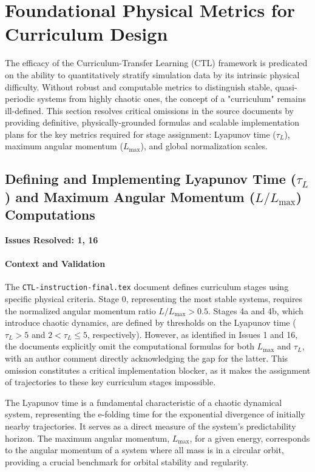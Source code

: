 \documentclass[11pt, a4paper]{article}
\begin{document}
\clearpage
\section{Foundational Physical Metrics for Curriculum Design}
The efficacy of the Curriculum-Transfer Learning (CTL) framework is predicated on the ability to quantitatively stratify simulation data by its intrinsic physical difficulty. Without robust and computable metrics to distinguish stable, quasi-periodic systems from highly chaotic ones, the concept of a "curriculum" remains ill-defined. This section resolves critical omissions in the source documents by providing definitive, physically-grounded formulas and scalable implementation plans for the key metrics required for stage assignment: Lyapunov time ($\tau_L$), maximum angular momentum ($L_{\max}$), and global normalization scales.

\subsection{Defining and Implementing Lyapunov Time (\texorpdfstring{$\tau_L$}{tau\_L}) and Maximum Angular Momentum (\texorpdfstring{$L/L_{\max}$}{L/L\_max}) Computations}
\textbf{Issues Resolved: 1, 16}
\paragraph{Context and Validation}
The \texttt{CTL-instruction-final.tex} document defines curriculum stages using specific physical criteria. Stage 0, representing the most stable systems, requires the normalized angular momentum ratio $L/L_{\max} > 0.5$. Stages 4a and 4b, which introduce chaotic dynamics, are defined by thresholds on the Lyapunov time ($\tau_L > 5$ and $2 < \tau_L \leq 5$, respectively). However, as identified in Issues 1 and 16, the documents explicitly omit the computational formulas for both $L_{\max}$ and $\tau_L$, with an author comment directly acknowledging the gap for the latter. This omission constitutes a critical implementation blocker, as it makes the assignment of trajectories to these key curriculum stages impossible.

The Lyapunov time is a fundamental characteristic of a chaotic dynamical system, representing the e-folding time for the exponential divergence of initially nearby trajectories. It serves as a direct measure of the system's predictability horizon. The maximum angular momentum, $L_{\max}$, for a given energy, corresponds to the angular momentum of a system where all mass is in a circular orbit, providing a crucial benchmark for orbital stability and regularity.
\end{document}
